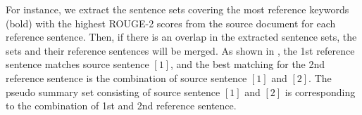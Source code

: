 For instance, 
we extract the sentence sets covering the most reference keywords (bold) with the highest ROUGE-2 scores
from the source document for each reference sentence. Then, if there is an overlap in the extracted sentence sets, the sets and their reference sentences will be merged.
As shown in ,
the 1st reference sentence matches source sentence $[1]$,
and the best matching for the 2nd reference sentence is the combination of source sentence $[1]$ and $[2]$. 
The pseudo summary set consisting of source sentence $[1]$ and $[2]$
is corresponding to the combination of 1st and 2nd reference sentence. 

